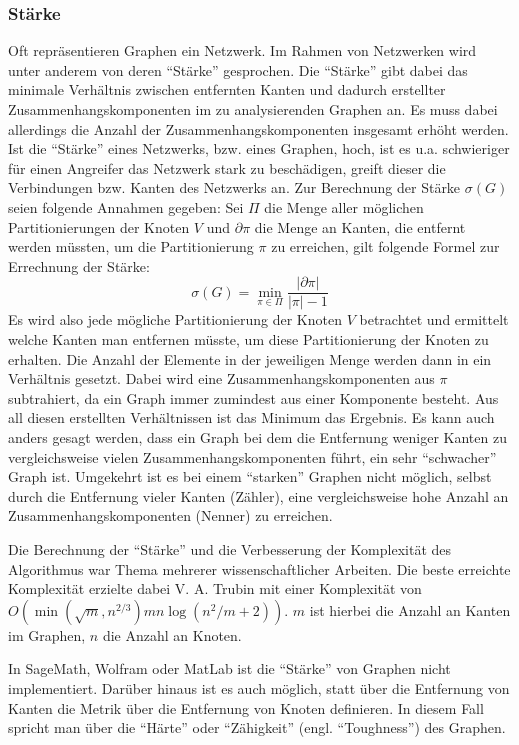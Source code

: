 \documentclass[a4paper,12pt,ngerman,chapterprefix=false,listof=totoc,bibliography=totoc]{scrreprt}
\begin{document}
\subsubsection*{Stärke}
{
Oft repräsentieren Graphen ein Netzwerk. Im Rahmen von Netzwerken wird unter anderem von deren "`Stärke"' gesprochen. Die "`Stärke"' gibt dabei das minimale Verhältnis zwischen entfernten Kanten und dadurch erstellter Zusammenhangskomponenten im zu analysierenden Graphen an. Es muss dabei allerdings die Anzahl der Zusammenhangskomponenten insgesamt erhöht werden. Ist die "`Stärke"' eines Netzwerks, bzw. eines Graphen, hoch, ist es u.a. schwieriger für einen Angreifer das Netzwerk stark zu beschädigen, greift dieser die Verbindungen bzw. Kanten des Netzwerks an. Zur Berechnung der Stärke \(\sigma(G)\) seien folgende Annahmen gegeben: Sei \(\Pi\) die Menge aller möglichen Partitionierungen der Knoten \(V\) und \(\partial\pi\) die Menge an Kanten, die entfernt werden müssten, um die Partitionierung \(\pi\) zu erreichen, gilt folgende Formel zur Errechnung der Stärke:
\[\sigma(G)=\min_{\pi\in\Pi}\frac{\vert\partial\pi\vert}{\vert\pi\vert -1}\]
Es wird also jede mögliche Partitionierung der Knoten \(V\) betrachtet und ermittelt welche Kanten man entfernen müsste, um diese Partitionierung der Knoten zu erhalten. Die Anzahl der Elemente in der jeweiligen Menge werden dann in ein Verhältnis gesetzt. Dabei wird eine Zusammenhangskomponenten aus \(\pi\) subtrahiert, da ein Graph immer zumindest aus einer Komponente besteht. Aus all diesen erstellten Verhältnissen ist das Minimum das Ergebnis. \cite{trubin_strenght_1993,cunningham_optimal_1985} Es kann auch anders gesagt werden, dass ein Graph bei dem die Entfernung weniger Kanten zu vergleichsweise vielen Zusammenhangskomponenten führt, ein sehr "`schwacher"' Graph ist. Umgekehrt ist es bei einem "`starken"' Graphen nicht möglich, selbst durch die Entfernung vieler Kanten (Zähler), eine vergleichsweise hohe Anzahl an Zusammenhangskomponenten (Nenner) zu erreichen.

Die Berechnung der "`Stärke"' und die Verbesserung der Komplexität des Algorithmus war Thema mehrerer wissenschaftlicher Arbeiten. Die beste erreichte Komplexität erzielte dabei V. A. Trubin mit einer Komplexität von \(O(\min(\sqrt{m},n^{2/3})mn\log(n^2/m+2))\). \(m\) ist hierbei die Anzahl an Kanten im Graphen, \(n\) die Anzahl an Knoten. \cite{trubin_strenght_1993}

In SageMath, Wolfram oder MatLab ist die "`Stärke"' von Graphen nicht implementiert. Darüber hinaus ist es auch möglich, statt über die Entfernung von Kanten die Metrik über die Entfernung von Knoten definieren. In diesem Fall spricht man über die "`Härte"' oder "`Zähigkeit"' (engl. "`Toughness"') des Graphen. \cite{chvatal_tough_2006}
}
\end{document}
